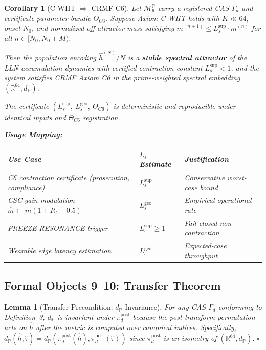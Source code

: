 \documentclass[12pt,letterpaper]{article}
\theoremstyle{definition}
\theoremstyle{plain}
\newtheorem{corollary}[theorem]{Corollary}
\newtheorem{lemma}[theorem]{Lemma}
\theoremstyle{remark}
\newcommand{\dP}{d_{\mathbb{P}}}
\newcommand{\TC}{\Theta_{C6}}
\newcommand{\hhat}{\hat{h}}
\newcommand{\mbar}{\bar{m}}
\newcommand{\Lsup}{L_s^{\sup}}
\newcommand{\Lgeo}{L_s^{\mathrm{geo}}}
\begin{document}
\begin{corollary}[C-WHT $\Rightarrow$ CRMF C6]
Let $\mathcal{M}_6^{\mathbb{P}}$ carry a registered CAS $\Gamma_d$ and certificate parameter bundle $\TC$. Suppose Axiom C-WHT holds with $K \ll 64$, onset $N_0$, and normalized off-attractor mass satisfying $\mbar^{(n+1)} \le \Lsup \cdot \mbar^{(n)}$ for all $n \in [N_0, N_0+M)$.

Then the population encoding $\hhat^{(N)}/N$ is a \textbf{stable spectral attractor} of the LLN accumulation dynamics with certified contraction constant $\Lsup < 1$, and the system satisfies CRMF Axiom C6 in the prime-weighted spectral embedding $(\mathbb{R}^{64}, \dP)$.

The certificate $({\Lsup},\ \Lgeo,\ \TC)$ is deterministic and reproducible under identical inputs and $\TC$ registration.

\medskip
\noindent\textbf{Usage Mapping:}
\begin{center}
\begin{tabular}{lll}
\toprule
Use Case & $L_s$ Estimate & Justification \\
\midrule
C6 contraction certificate (prosecution, compliance) & $\Lsup$ & Conservative worst-case bound \\
CSC gain modulation $\hat{m} \leftarrow m(1+R_t-0.5)$ & $\Lgeo$ & Empirical operational rate \\
FREEZE-RESONANCE trigger & $\Lsup \ge 1$ & Fail-closed non-contraction \\
Wearable edge latency estimation & $\Lgeo$ & Expected-case throughput \\
\bottomrule
\end{tabular}
\end{center}
\end{corollary}

\subsection{Formal Objects 9--10: Transfer Theorem}

\begin{lemma}[Transfer Precondition: $\dP$ Invariance]
For any CAS $\Gamma_d$ conforming to Definition~3, $\dP$ is invariant under $\pi_d^{\mathrm{post}}$ because the post-transform permutation acts on $\hhat$ after the metric is computed over canonical indices. Specifically, $\dP(\hhat, \hat{\tau}) = \dP(\pi_d^{\mathrm{post}}(\hhat), \pi_d^{\mathrm{post}}(\hat{\tau}))$ since $\pi_d^{\mathrm{post}}$ is an isometry of $(\mathbb{R}^{64}, \dP)$. \hfill$\square$
\end{lemma}
\end{document}
